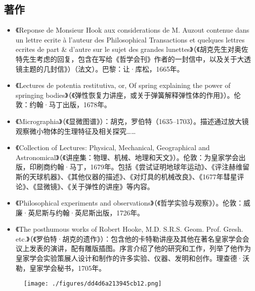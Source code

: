 \subsection{著作} 
\begin{itemize}
\item 《Reponse de Monsieur Hook aux considerations de M. Auzout contenue dans un lettre ecrite à l'auteur des Philosophical Transactions et quelques lettres ecrites de part & d'autre sur le sujet des grandes lunettes》（《胡克先生对奥佐特先生考虑的回复，包含在写给《哲学会刊》作者的一封信中，以及关于大透镜主题的几封信》）（法文）。巴黎：让·库松，1665年。  
\item 《Lectures de potentia restitutiva, or, Of spring explaining the power of springing bodies》（《弹性恢复力讲座，或关于弹簧解释弹性体的作用》）。伦敦：约翰·马丁出版，1678年。  
\item 《Micrographia》（《显微图谱》）：胡克，罗伯特（1635–1703）。描述通过放大镜观察微小物体的生理特征及相关探究……  
\item 《Collection of Lectures: Physical, Mechanical, Geographical and Astronomical》（《讲座集：物理、机械、地理和天文》）。伦敦：为皇家学会出版，印刷商约翰·马丁，1679年。包括《尝试证明地球年运动》、《评注赫维留斯的天球机器》、《其他仪器的描述》、《对灯具的机械改良》、《1677年彗星评论》、《显微镜》、《关于弹性的讲座》等内容。  
\item 《Philosophical experiments and observations》（《哲学实验与观察》）。伦敦：威廉·英尼斯与约翰·英尼斯出版，1726年。  
\item 《The posthumous works of Robert Hooke, M.D. S.R.S. Geom. Prof. Gresh. etc.》（《罗伯特·胡克的遗作》）：包含他的卡特勒讲座及其他在著名皇家学会会议上发表的演讲，配有雕版插图。序言介绍了他的研究和工作，列举了他作为皇家学会实验策展人设计和制作的许多实验、仪器、发明和创作。理查德·沃勒，皇家学会秘书，1705年。
\end{itemize}
\begin{figure}[ht]
\centering
\texttt{[image: ./figures/dd4d6a213945cb12.png]}
\caption{} \label{fig_HK_11}
\end{figure}
